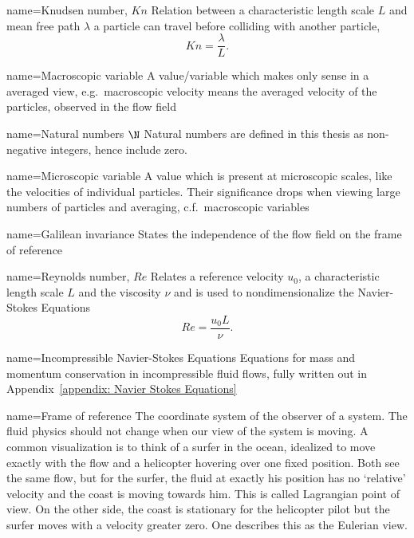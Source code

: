 
{
name={Knudsen number, $Kn$}
}
{Relation between a characteristic length scale $L$ and mean free path $\lambda$ a particle can travel before colliding with another particle,
\begin{equation*}
  Kn=\frac{\lambda}{L}.
\end{equation*}}

{
name={Macroscopic variable}
}
{A value/variable which makes only sense in a averaged view, e.g.\ macroscopic velocity means the averaged velocity of the particles, observed in the flow field
}

{
name={Natural numbers $\N$}
}
{Natural numbers are defined in this thesis as non-negative integers, hence include zero.
}

{
name={Microscopic variable}
}
{
A value which is present at microscopic scales, like the velocities of individual particles.
Their significance drops when viewing large numbers of particles and averaging, c.f.\ macroscopic variables
}

{
name={Galilean invariance}
}{States the independence of the flow field on the frame of reference}

{
name={Reynolds number, $Re$}
}
{Relates a reference velocity $u_0$, a characteristic length scale $L$ and the viscosity $\nu$ and is used to nondimensionalize the Navier-Stokes Equations
\begin{equation*}
  \label{eq: definition of reynolds number}
  Re=\frac{u_0 L}{\nu}.
\end{equation*}}

{
name={Incompressible Navier-Stokes Equations}
}
{Equations for mass and momentum conservation in incompressible fluid flows, fully written out in Appendix~\ref{appendix: Navier Stokes Equations}
}

{
name={Frame of reference}
}
{
The coordinate system of the observer of a system.
The fluid physics should not change when our view of the system is moving.
A common visualization is to think of a surfer in the ocean, idealized to move exactly with the flow and a helicopter hovering over one fixed position.
Both see the same flow, but for the surfer, the fluid at exactly his position has no `relative' velocity and the coast is moving towards him. This is called Lagrangian point of view.
On the other side, the coast is stationary for the helicopter pilot but the surfer moves with a velocity greater zero. One describes this as the Eulerian view.
}
